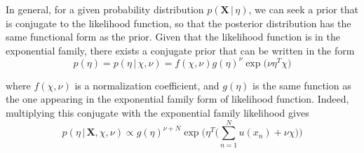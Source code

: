   In general, for a given probability distribution $p(\mathbf{X}\,|\, \eta)$, we can seek a prior that is conjugate to the likelihood function, so that the posterior distribution has the same functional form as the prior. Given that the likelihood function is in the exponential family, there exists a conjugate prior that can be written in the form
  \begin{equation}
    p(\eta) = p(\eta\,|\, \chi, \nu) = f(\chi, \nu) g(\eta)^\nu \exp \big( \nu \eta^T \chi \big)
  \end{equation}

  where $f(\chi, \nu)$ is a normalization coefficient, and $g(\eta)$ is the same function as the one appearing in the exponential family form of likelihood function. Indeed, multiplying this conjugate with the exponential family likelihood gives
  \begin{equation}
    p(\eta\,|\, \mathbf{X}, \chi, \nu) \propto g(\eta)^{\nu + N} \exp \Bigg( \eta^T \bigg( \sum_{n=1}^N u(x_n) + \nu \chi \bigg) \Bigg)
  \end{equation}


